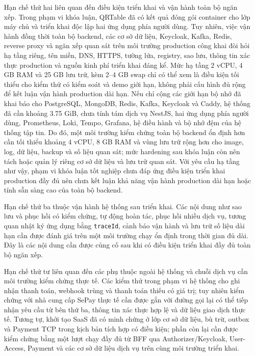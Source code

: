Hạn chế thứ hai liên quan đến điều kiện triển khai và vận hành toàn bộ ngăn xếp. Trong phạm vi khóa luận, QRTable đã có kết quả đóng gói container cho lớp máy chủ và triển khai độc lập hai ứng dụng phía người dùng. Tuy nhiên, việc vận hành đồng thời toàn bộ backend, các cơ sở dữ liệu, Keycloak, Kafka, Redis, reverse proxy và ngăn xếp quan sát trên môi trường production công khai đòi hỏi hạ tầng riêng, tên miền, DNS, HTTPS, tường lửa, registry, sao lưu, thông tin xác thực production và nguồn kinh phí triển khai đáng kể. Mức hạ tầng 2 vCPU, 4 GB RAM và 25 GB lưu trữ, kèm 2--4 GB swap chỉ có thể xem là điều kiện tối thiểu cho kiểm thử có kiểm soát và demo giới hạn, không phải cấu hình đủ rộng để kết luận vận hành production dài hạn. Nếu chỉ cộng các giới hạn bộ nhớ đã khai báo cho PostgreSQL, MongoDB, Redis, Kafka, Keycloak và Caddy, hệ thống đã cần khoảng 3.75 GiB, chưa tính tám dịch vụ NestJS, hai ứng dụng phía người dùng, Prometheus, Loki, Tempo, Grafana, hệ điều hành và bộ nhớ đệm của hệ thống tập tin. Do đó, một môi trường kiểm chứng toàn bộ backend ổn định hơn cần tối thiểu khoảng 4 vCPU, 8 GB RAM và vùng lưu trữ rộng hơn cho image, log, dữ liệu, backup và số liệu quan sát; mức hardening sau khóa luận còn nên tách hoặc quản lý riêng cơ sở dữ liệu và lưu trữ quan sát. Với yêu cầu hạ tầng như vậy, phạm vi khóa luận tốt nghiệp chưa đáp ứng điều kiện triển khai production đầy đủ nên chưa kết luận khả năng vận hành production dài hạn hoặc tính sẵn sàng cao của toàn bộ backend.

Hạn chế thứ ba thuộc vận hành hệ thống sau triển khai. Các nội dung như sao lưu và phục hồi có kiểm chứng, tự động hoàn tác, phục hồi nhiều dịch vụ, tương quan nhật ký ứng dụng bằng \texttt{traceId}, cảnh báo vận hành và lưu trữ số liệu dài hạn cần được đánh giá trên một môi trường chạy ổn định trong thời gian đủ dài. Đây là các nội dung cần được củng cố sau khi có điều kiện triển khai đầy đủ toàn bộ ngăn xếp.

Hạn chế thứ tư liên quan đến các phụ thuộc ngoài hệ thống và chuỗi dịch vụ cần môi trường kiểm chứng thực tế. Các kiểm thử trong phạm vi hệ thống cho ghi nhận thanh toán, webhook trùng và thanh toán thiếu có giá trị; tuy nhiên kiểm chứng với nhà cung cấp SePay thực tế cần được gắn với đường gọi lại có thể tiếp nhận yêu cầu từ bên thứ ba, thông tin xác thực hợp lệ và dữ liệu giao dịch thực tế. Tương tự, khởi tạo SaaS đã có minh chứng ở lớp cơ sở dữ liệu, bù trừ, outbox và Payment TCP trong kịch bản tích hợp có điều kiện; phần còn lại cần được kiểm chứng bằng một lượt chạy đầy đủ từ BFF qua Authorizer/Keycloak, User-Access, Payment và các cơ sở dữ liệu dịch vụ trên cùng môi trường triển khai.

